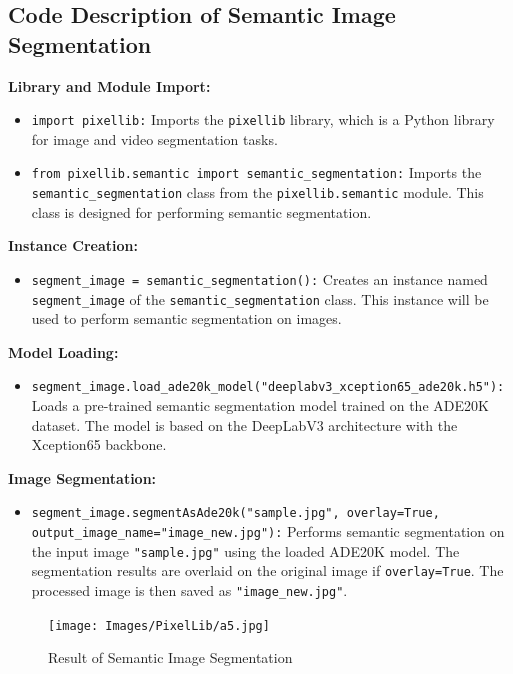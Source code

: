 \subsection*{Code Description of Semantic Image Segmentation}

\textbf{Library and Module Import:}
\begin{itemize}
    \item \texttt{import pixellib:} Imports the \texttt{pixellib} library, which is a Python library for image and video segmentation tasks.
    \item \texttt{from pixellib.semantic import semantic\_segmentation:} Imports the \texttt{semantic\_segmentation} class from the \texttt{pixellib.semantic} module. This class is designed for performing semantic segmentation.
\end{itemize}

\textbf{Instance Creation:}
\begin{itemize}
    \item \texttt{segment\_image = semantic\_segmentation():} Creates an instance named \texttt{segment\_image} of the \texttt{semantic\_segmentation} class. This instance will be used to perform semantic segmentation on images.
\end{itemize}

\textbf{Model Loading:}
\begin{itemize}
    \item \texttt{segment\_image.load\_ade20k\_model("deeplabv3\_xception65\_ade20k.h5"):} Loads a pre-trained semantic segmentation model trained on the ADE20K dataset. The model is based on the DeepLabV3 architecture with the Xception65 backbone.
\end{itemize}

\textbf{Image Segmentation:}
\begin{itemize}
    \item \texttt{segment\_image.segmentAsAde20k("sample.jpg", overlay=True, output\_image\_name="image\_new.jpg"):} Performs semantic segmentation on the input image \texttt{"sample.jpg"} using the loaded ADE20K model. The segmentation results are overlaid on the original image if \texttt{overlay=True}. The processed image is then saved as \texttt{"image\_new.jpg"}.
\end{itemize}

\begin{figure}[h!]
    \centering
    \texttt{[image: Images/PixelLib/a5.jpg]} %
    
    \caption{Result of Semantic Image Segmentation}
    \label{fig:your_image_label}
    
    
\end{figure}

